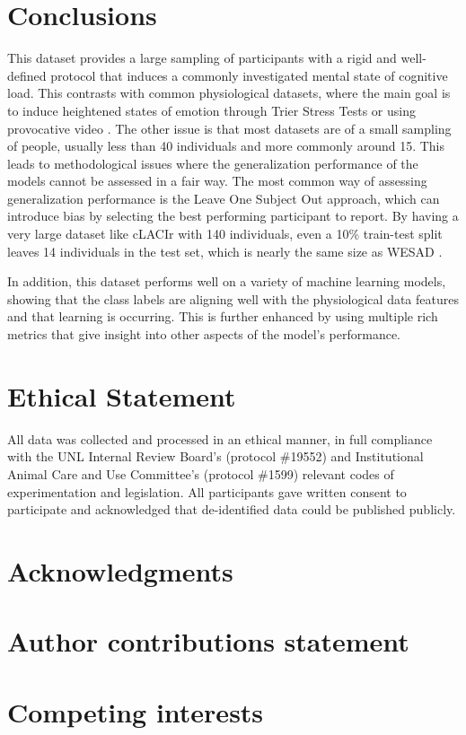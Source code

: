 \documentclass[12pt]{iopart}
\begin{document}
\section*{Conclusions}

This dataset provides a large sampling of participants with a rigid and well-defined protocol that induces a commonly investigated mental state of cognitive load.  This contrasts with common physiological datasets, where the main goal is to induce heightened states of emotion through Trier Stress Tests \cite{schmidt2018introducing} or using provocative video \cite{sharma2019dataset}.  The other issue is that most datasets are of a small sampling of people, usually less than 40 individuals and more commonly around 15.  This leads to methodological issues where the generalization performance of the models cannot be assessed in a fair way.  The most common way of assessing generalization performance is the Leave One Subject Out approach, which can introduce bias by selecting the best performing participant to report.  By having a very large dataset like cLACIr with 140 individuals, even a 10\% train-test split leaves 14 individuals in the test set, which is nearly the same size as WESAD \cite{schmidt2018introducing}.  

In addition, this dataset performs well on a variety of machine learning models, showing that the class labels are aligning well with the physiological data features and that learning is occurring.  This is further enhanced by using multiple rich metrics that give insight into other aspects of the model's performance.

\section*{Ethical Statement}

All data was collected and processed in an ethical manner, in full compliance with the UNL Internal Review Board's (protocol \#19552) and Institutional Animal Care and Use Committee's (protocol \#1599) relevant codes of experimentation and legislation.  All participants gave written consent to participate and acknowledged that de-identified data could be published publicly. 

\section*{Acknowledgments} 

\section*{Author contributions statement}

\section*{Competing interests} 

\printbibliography %
\end{document}
